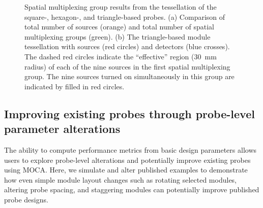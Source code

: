 \begin{figure}
\begin{center}
\end{center}
\caption {Spatial multiplexing group results from the tessellation of the square-, hexagon-, and triangle-based probes. (a) Comparison of total number of sources (orange) and total number of spatial multiplexing groups (green). (b) The triangle-based module tessellation with sources (red circles) and detectors (blue crosses). The dashed red circles indicate the ``effective'' region (30~mm radius) of each of the nine sources in the first spatial multiplexing group. The nine sources turned on simultaneously in this group are indicated by filled in red circles.} \label{fig:fullgroups}
\end{figure} 


\subsection{Improving existing probes through probe-level parameter alterations}
The ability to compute performance metrics from basic design parameters allows users to explore probe-level alterations and potentially improve existing probes using MOCA. Here, we simulate and alter published examples to demonstrate how even simple module layout changes such as rotating selected modules, altering probe spacing, and staggering modules can potentially improve published probe designs.

